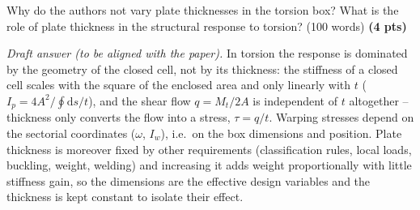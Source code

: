 Why do the authors not vary plate thicknesses in the torsion box? What is the role of plate thickness in the structural response to torsion? (100 words) \textbf{(4 pts)}

\bigskip
\emph{Draft answer (to be aligned with the paper).} In torsion the response is dominated by the geometry of the closed cell, not by its thickness: the stiffness of a closed cell scales with the square of the enclosed area and only linearly with $t$ ($I_p=4A^2/\oint\mathrm{d}s/t$), and the shear flow $q=M_t/2A$ is independent of $t$ altogether -- thickness only converts the flow into a stress, $\tau=q/t$. Warping stresses depend on the sectorial coordinates ($\omega$, $I_w$), i.e.\ on the box dimensions and position. Plate thickness is moreover fixed by other requirements (classification rules, local loads, buckling, weight, welding) and increasing it adds weight proportionally with little stiffness gain, so the dimensions are the effective design variables and the thickness is kept constant to isolate their effect.
